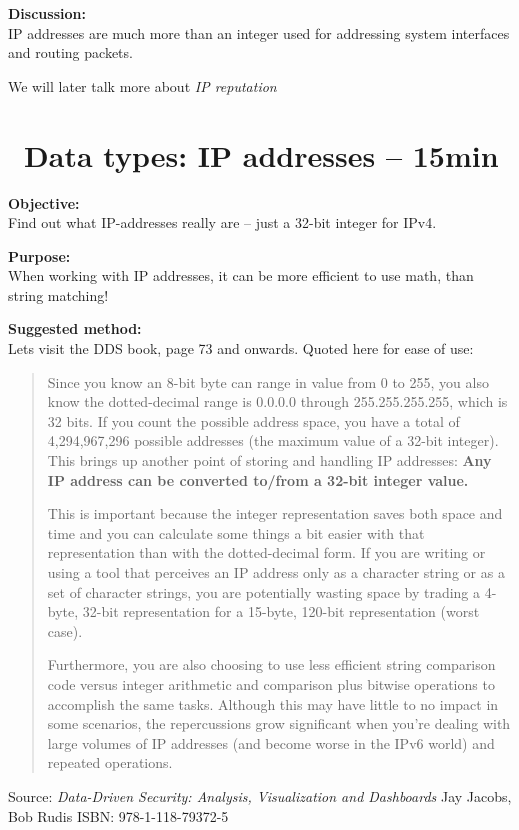 \documentclass[a4paper,11pt,notitlepage]{report}
\begin{document}
{\bf Discussion:}\\
IP addresses are much more than an integer used for addressing system interfaces and routing packets.

We will later talk more about \emph{IP reputation}


\chapter{\faExclamationTriangle\ Data types: IP addresses -- 15min}
\label{ex:data-types-ip-address}

{\bf Objective:}\\
Find out what IP-addresses really are -- just a 32-bit integer for IPv4.


{\bf Purpose:}\\
When working with IP addresses, it can be more efficient to use math, than string matching!


{\bf Suggested method:}\\
Lets visit the DDS book, page 73 and onwards. Quoted here for ease of use:


\begin{quote}
Since you know an 8-bit byte can range in value from 0 to 255, you also know the dotted-decimal range is 0.0.0.0 through 255.255.255.255, which is 32 bits. If you count the possible address space, you have a total of 4,294,967,296 possible addresses (the maximum value of a 32-bit integer). This brings up another point of storing and handling IP addresses: {\bf Any IP address can be converted to/from a 32-bit integer value.}

This is important because the integer representation saves both space and time and you can calculate some things a bit easier with that representation than with the dotted-decimal form. If you are writing or using a tool that perceives an IP address only as a character string or as a set of character strings, you are potentially wasting space by trading a 4-byte, 32-bit representation for a 15-byte, 120-bit representation (worst case).

Furthermore, you are also choosing to use less efficient string comparison code versus integer arithmetic and comparison plus bitwise operations to accomplish the same tasks. Although this may have little to no impact in some scenarios, the repercussions grow significant when you’re dealing with large volumes of IP addresses (and become worse in the IPv6 world) and repeated operations.
\end{quote}
Source: \emph{Data-Driven Security: Analysis, Visualization and Dashboards} Jay Jacobs, Bob Rudis  ISBN: 978-1-118-79372-5
\end{document}
